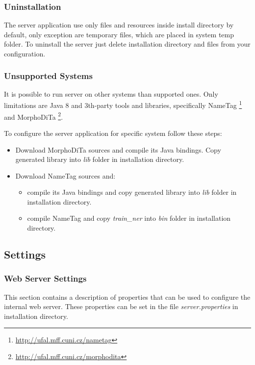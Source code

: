 \subsubsection{Uninstallation}
The server application use only files and resources inside install directory by
default, only exception are temporary files, which are placed in system temp folder.
To uninstall the server just delete installation directory and files from your
configuration.

\subsubsection{Unsupported Systems}
\label{sssec:unsupport}
It is possible to run \textan{} server on other systems than supported ones. Only
limitations are Java 8 and 3th-party tools and libraries, specifically NameTag%
\footnote{\url{http://ufal.mff.cuni.cz/nametag}} and MorphoDiTa%
\footnote{\url{http://ufal.mff.cuni.cz/morphodita}}.

To configure the server application for specific system follow these steps:
\begin{itemize}
\item Download MorphoDiTa sources and compile its Java bindings. Copy generated
library into \emph{lib} folder in installation directory.
\item Download NameTag sources and:
	\begin{itemize}
	\item compile its Java bindings and copy generated library into \emph{lib}
	folder in installation directory.
	\item compile NameTag and copy \emph{train\_ner} into \emph{bin} folder in
	installation directory.
	\end{itemize}
\end{itemize}

\subsection{Settings}
\label{sec:ServerSettings}

\subsubsection{Web Server Settings}
\label{sssec:WebServerSettings}
This section contains a description of properties that can be used to configure
the internal web server. These properties can be set in the file \emph{server.properties}
in installation directory.


